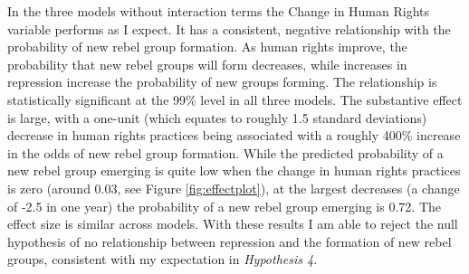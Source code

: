 \documentclass[12pt,]{book}
\theoremstyle{definition}
\theoremstyle{definition}
\theoremstyle{definition}
\theoremstyle{remark}
\begin{document}
In the three models without interaction terms the Change in Human Rights
variable performs as I expect. It has a consistent, negative
relationship with the probability of new rebel group formation. As human
rights improve, the probability that new rebel groups will form
decreases, while increases in repression increase the probability of new
groups forming. The relationship is statistically significant at the
99\% level in all three models. The substantive effect is large, with a
one-unit (which equates to roughly 1.5 standard deviations) decrease in
human rights practices being associated with a roughly 400\% increase in
the odds of new rebel group formation. While the predicted probability
of a new rebel group emerging is quite low when the change in human
rights practices is zero (around 0.03, see Figure \ref{fig:effectplot}),
at the largest decreases (a change of -2.5 in one year) the probability
of a new rebel group emerging is 0.72. The effect size is similar across
models. With these results I am able to reject the null hypothesis of no
relationship between repression and the formation of new rebel groups,
consistent with my expectation in \emph{Hypothesis 4}.
\end{document}

